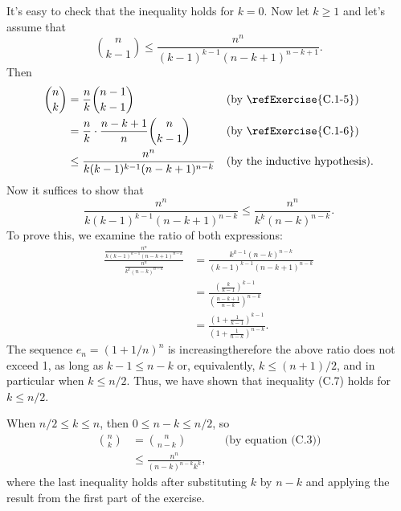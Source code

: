 \starred
It's easy to check that the inequality holds for $k=0$.
Now let $k\ge1$ and let's assume that
\[
    \binom{n}{k-1} \le \frac{n^n}{(k-1)^{k-1}(n-k+1)^{n-k+1}}.
\]
Then
\begin{align*}
    \binom{n}{k} &= \frac{n}{k}\binom{n-1}{k-1} && \text{(by \refExercise{C.1-5})} \\
    &= \frac{n}{k}\cdot\frac{n-k+1}{n}\binom{n}{k-1} && \text{(by \refExercise{C.1-6})} \\
    &\le \frac{n^n}{k(k-1)^{k-1}(n-k+1)^{n-k}} && \text{(by the inductive hypothesis)}.
\end{align*}
Now it suffices to show that
\[
    \frac{n^n}{k(k-1)^{k-1}(n-k+1)^{n-k}} \le \frac{n^n}{k^k(n-k)^{n-k}}.
\]
To prove this, we examine the ratio of both expressions:
\begin{align*}
    \frac{\frac{n^n}{k(k-1)^{k-1}(n-k+1)^{n-k}}}{\frac{n^n}{k^k(n-k)^{n-k}}} &= \frac{k^{k-1}(n-k)^{n-k}}{(k-1)^{k-1}(n-k+1)^{n-k}} \\
    &= \frac{\left(\frac{k}{k-1}\right)^{k-1}}{\left(\frac{n-k+1}{n-k}\right)^{n-k}} \\
    &= \frac{\left(1+\frac{1}{k-1}\right)^{k-1}}{\left(1+\frac{1}{n-k}\right)^{n-k}}.
\end{align*}
The sequence $e_n={(1+1/n)}^n$ is increasing\dash therefore the above ratio does not exceed 1, as long as $k-1\le n-k$ or, equivalently, $k\le(n+1)/2$, and in particular when $k\le n/2$.
Thus, we have shown that inequality (C.7) holds for $k\le n/2$.

When $n/2\le k\le n$, then $0\le n-k\le n/2$, so
\begin{align*}
    \binom{n}{k} &= \binom{n}{n-k} && \text{(by equation (C.3))} \\
    &\le \frac{n^n}{(n-k)^{n-k}k^k},
\end{align*}
where the last inequality holds after substituting $k$ by $n-k$ and applying the result from the first part of the exercise.
